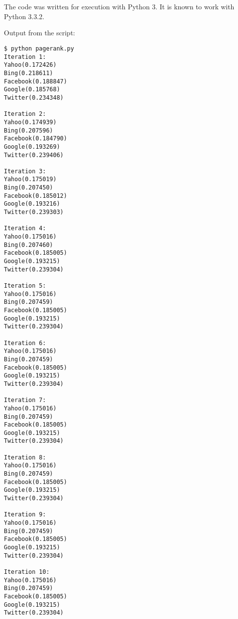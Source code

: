 
\section{} \label{appendix:3}

The code was written for execution with Python 3. It is known to work with
Python 3.3.2.



Output from the script:

\begin{lstlisting}
$ python pagerank.py
Iteration 1:
Yahoo(0.172426)
Bing(0.218611)
Facebook(0.188847)
Google(0.185768)
Twitter(0.234348)

Iteration 2:
Yahoo(0.174939)
Bing(0.207596)
Facebook(0.184790)
Google(0.193269)
Twitter(0.239406)

Iteration 3:
Yahoo(0.175019)
Bing(0.207450)
Facebook(0.185012)
Google(0.193216)
Twitter(0.239303)

Iteration 4:
Yahoo(0.175016)
Bing(0.207460)
Facebook(0.185005)
Google(0.193215)
Twitter(0.239304)

Iteration 5:
Yahoo(0.175016)
Bing(0.207459)
Facebook(0.185005)
Google(0.193215)
Twitter(0.239304)

Iteration 6:
Yahoo(0.175016)
Bing(0.207459)
Facebook(0.185005)
Google(0.193215)
Twitter(0.239304)

Iteration 7:
Yahoo(0.175016)
Bing(0.207459)
Facebook(0.185005)
Google(0.193215)
Twitter(0.239304)

Iteration 8:
Yahoo(0.175016)
Bing(0.207459)
Facebook(0.185005)
Google(0.193215)
Twitter(0.239304)

Iteration 9:
Yahoo(0.175016)
Bing(0.207459)
Facebook(0.185005)
Google(0.193215)
Twitter(0.239304)

Iteration 10:
Yahoo(0.175016)
Bing(0.207459)
Facebook(0.185005)
Google(0.193215)
Twitter(0.239304)
\end{lstlisting}


